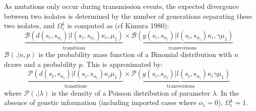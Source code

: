 \documentclass[10pt]{article}
\begin{document}
As mutations only occur during transmission events, the expected divergence between two isolates is determined by the number of generations separating these two isolates, and $\Omega_i^1$ is computed as (cf Kimura 1980): 
\begin{equation}
\underbrace{\mathcal{B}\left(d(s_i,s_{\alpha_i}) | l(s_i,s_{\alpha_i}) \kappa_i, \mu_1 \right)}_{\mbox{transitions}}
\times 
\underbrace{\mathcal{B}\left(g(s_i,s_{\alpha_i}) | l(s_i,s_{\alpha_i}) \kappa_i, \gamma \mu_1 \right)}_{\mbox{transversions}}
\end{equation}
$\mathcal{B}(. | n, p)$ is the probability mass function of a Binomial distribution with $n$ draws and a probability $p$.
This is approximated by:
\begin{equation}
 \underbrace{\mathcal{P}\left(d(s_i,s_{\alpha_i}) | l(s_i,s_{\alpha_i}) \kappa_i \mu_1 \right)}_{\mbox{transitions}}
 \times 
 \underbrace{\mathcal{P}\left(g(s_i,s_{\alpha_i}) | l(s_i,s_{\alpha_i}) \kappa_i \gamma \mu_1 \right)}_{\mbox{transversions}}
 \end{equation}
where $\mathcal{P}(. | \lambda)$ is the density of a Poisson distribution of parameter $\lambda$.
In the absence of genetic information (including imported cases where $\alpha_i=0$), $\Omega_i^1 = 1$.
~\\
\end{document}
